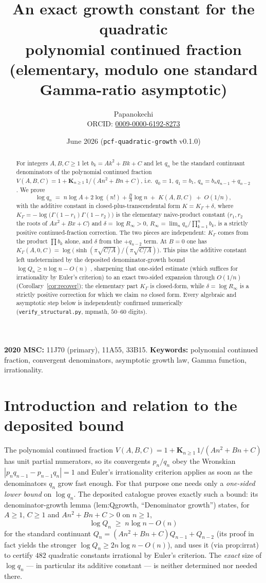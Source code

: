 \documentclass[11pt]{article}
\title{An exact growth constant for the quadratic\\
polynomial continued fraction\\[2pt]
\large (elementary, modulo one standard Gamma-ratio asymptotic)}
\author{Papanokechi\\
\small ORCID: \href{https://orcid.org/0009-0000-6192-8273}{0009-0000-6192-8273}}
\date{June 2026 \quad(\texttt{pcf-quadratic-growth} v0.1.0)}
\begin{document}
\maketitle

\begin{abstract}
For integers $A,B,C\ge 1$ let $b_k=Ak^2+Bk+C$ and let $q_n$ be the standard
continuant denominators of the polynomial continued fraction
$V(A,B,C)=1+\mathbf{K}_{n\ge1}\,1/(An^2+Bn+C)$, i.e.\ $q_0=1$, $q_1=b_1$,
$q_n=b_n q_{n-1}+q_{n-2}$. We prove
\[
  \log q_n \;=\; n\log A + 2\log(n!) + \tfrac{B}{A}\log n
            \;+\; K(A,B,C) \;+\; O(1/n),
\]
with the additive constant in closed-plus-transcendental form
$K=K_\Gamma+\delta$, where
$K_\Gamma=-\log\!\big(\Gamma(1-r_1)\Gamma(1-r_2)\big)$ is the elementary
naive-product constant ($r_1,r_2$ the roots of $Ax^2+Bx+C$) and
$\delta=\log R_\infty>0$, $R_\infty=\lim_n q_n/\prod_{k=1}^n b_k$, is a strictly
positive continued-fraction correction. The two pieces are independent: $K_\Gamma$
comes from the product $\prod b_k$ alone, and $\delta$ from the $+q_{n-2}$ term.
At $B=0$ one has $K_\Gamma(A,0,C)=\log\!\big(\sinh(\pi\sqrt{C/A})/(\pi\sqrt{C/A})\big)$.
This pins the additive constant left undetermined by the deposited
denominator-growth bound $\log Q_n\ge n\log n-O(n)$ \cite{ladder}, sharpening that
one-sided estimate (which suffices for irrationality by Euler's criterion) to an
exact two-sided expansion through $O(1/n)$ (Corollary~\ref{cor:recover}); the
elementary part $K_\Gamma$ is closed-form, while $\delta=\log R_\infty$ is a
strictly positive correction for which we claim \emph{no} closed form. Every
algebraic and asymptotic step below is independently confirmed numerically
(\texttt{verify\_structural.py}, mpmath, $50$--$60$ digits).
\end{abstract}

\noindent\textbf{2020 MSC:} 11J70 (primary), 11A55, 33B15.\quad
\textbf{Keywords:} polynomial continued fraction, convergent denominators,
asymptotic growth law, Gamma function, irrationality.

\section{Introduction and relation to the deposited bound}

The polynomial continued fraction
$V(A,B,C)=1+\mathbf{K}_{n\ge1}\,1/(An^2+Bn+C)$ has unit partial numerators, so its
convergents $p_n/q_n$ obey the Wronskian $|p_nq_{n-1}-p_{n-1}q_n|=1$ and Euler's
irrationality criterion applies as soon as the denominators $q_n$ grow fast
enough. For that purpose one needs only a \emph{one-sided lower bound} on
$\log q_n$. The deposited catalogue \cite{ladder} proves exactly such a bound: its
denominator-growth lemma (\textsf{lem:Qgrowth}, ``Denominator growth'') states,
for $A\ge1$, $C\ge1$ and $An^2+Bn+C>0$ on $n\ge1$,
\[
  \log Q_n \;\ge\; n\log n - O(n)
\]
for the standard continuant $Q_n=(An^2+Bn+C)Q_{n-1}+Q_{n-2}$ (its proof in fact
yields the stronger $\log Q_n\ge 2n\log n-O(n)$), and uses it (via
\textsf{prop:irrat}) to certify $482$ quadratic constants irrational by Euler's
criterion. The \emph{exact} size of $\log q_n$ — in particular its additive
constant — is neither determined nor needed there.
\end{document}
